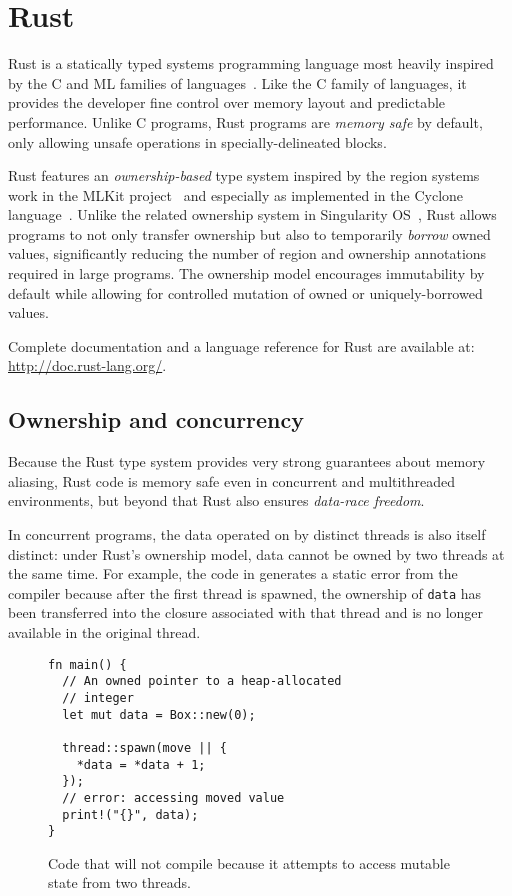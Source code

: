 
\section{Rust}
\label{sec:rust}

Rust is a statically typed systems programming language most heavily inspired by the C
and ML families of languages~\cite{RUST}.
Like the C family of languages, it provides the developer fine control over memory layout
and predictable performance.
Unlike C programs, Rust programs are \emph{memory safe} by default,
only allowing unsafe operations in specially-delineated blocks.

Rust features an \emph{ownership-based} type system inspired by the region systems work in the
MLKit project~\cite{mlkit} and especially as implemented in the Cyclone language~\cite{cyclone}.
Unlike the related ownership system in Singularity OS~\cite{singularity}, Rust allows programs to
not only transfer ownership but also to temporarily \emph{borrow} owned values, significantly
reducing the number of region and ownership annotations required in large programs.
The ownership model encourages immutability by default while allowing for controlled
mutation of owned or uniquely-borrowed values.

Complete documentation and a language reference for Rust are available at: \url{http://doc.rust-lang.org/}.

\subsection{Ownership and concurrency}
Because the Rust type system provides very strong guarantees about memory aliasing,
Rust code is memory safe even in concurrent and multithreaded environments,
but beyond that Rust also ensures \emph{data-race freedom}.

In concurrent programs, the data operated on by distinct threads is also itself distinct:
under Rust's ownership model, data cannot be owned by two threads at the same time.
For example, the code in  generates a static error from the compiler because
after the first thread is spawned, the ownership of \lstinline{data} has been transferred into the
closure associated with that thread and is no longer available in the original thread.
\begin{figure}
\begin{lstlisting}
fn main() {
  // An owned pointer to a heap-allocated
  // integer
  let mut data = Box::new(0);

  thread::spawn(move || {
    *data = *data + 1;
  });
  // error: accessing moved value
  print!("{}", data);
}
\end{lstlisting}
  \caption{Code that will not compile because it attempts to access mutable state from two threads.}
  \label{fig:bad-concurrency}
\end{figure}

